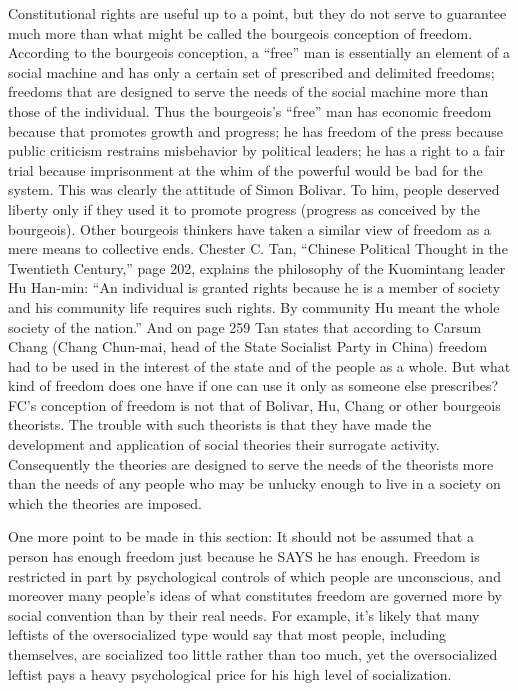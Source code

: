  Constitutional rights are useful up to a point, but they do not serve to guarantee much more than what might be called the bourgeois conception of freedom. According to the bourgeois conception, a “free” man is essentially an element of a social machine and has only a certain set of prescribed and delimited freedoms; freedoms that are designed to serve the needs of the social machine more than those of the individual. Thus the bourgeois’s “free” man has economic freedom because that promotes growth and progress; he has freedom of the press because public criticism restrains misbehavior by political leaders; he has a right to a fair trial because imprisonment at the whim of the powerful would be bad for the system. This was clearly the attitude of Simon Bolivar. To him, people deserved liberty only if they used it to promote progress (progress as conceived by the bourgeois). Other bourgeois thinkers have taken a similar view of freedom as a mere means to collective ends. Chester C. Tan, “Chinese Political Thought in the Twentieth Century,” page 202, explains the philosophy of the Kuomintang leader Hu Han-min: “An individual is granted rights because he is a member of society and his community life requires such rights. By community Hu meant the whole society of the nation.” And on page 259 Tan states that according to Carsum Chang (Chang Chun-mai, head of the State Socialist Party in China) freedom had to be used in the interest of the state and of the people as a whole. But what kind of freedom does one have if one can use it only as someone else prescribes? FC’s conception of freedom is not that of Bolivar, Hu, Chang or other bourgeois theorists. The trouble with such theorists is that they have made the development and application of social theories their surrogate activity. Consequently the theories are designed to serve the needs of the theorists more than the needs of any people who may be unlucky enough to live in a society on which the theories are imposed.

 One more point to be made in this section: It should not be assumed that a person has enough freedom just because he SAYS he has enough. Freedom is restricted in part by psychological controls of which people are unconscious, and moreover many people’s ideas of what constitutes freedom are governed more by social convention than by their real needs. For example, it’s likely that many leftists of the oversocialized type would say that most people, including themselves, are socialized too little rather than too much, yet the oversocialized leftist pays a heavy psychological price for his high level of socialization.

